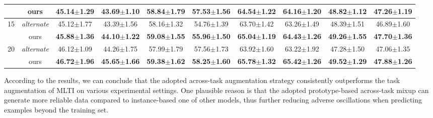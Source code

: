 \begin{table*}[ht]
{\begin{tabular}{@{}c|c|cccccccc@{}}
                      & ours                   & \textbf{45.14$\pm$1.29}          & \textbf{43.69$\pm$1.10}         & \textbf{58.84$\pm$1.79}          & \textbf{57.53$\pm$1.56}         & \textbf{64.54$\pm$1.22}         & \textbf{64.16$\pm$1.20}         & \textbf{48.82$\pm$1.12}         & \textbf{47.26$\pm$1.19}         \\ \midrule
\multirow{2}{*}{15}   & \textit{alternate}                 & 45.12$\pm$1.77                   & 43.39$\pm$1.56                  & 58.16$\pm$1.32                   & 54.76$\pm$1.39                  & 63.70$\pm$1.42                  & 63.26$\pm$1.49                  & 48.39$\pm$1.51                  & 46.89$\pm$1.60                  \\
                      & ours                   & \textbf{45.88$\pm$1.36}          & \textbf{44.10$\pm$1.22}         & \textbf{59.08$\pm$1.55}          & \textbf{55.96$\pm$1.50}         & \textbf{65.04$\pm$1.19}         & \textbf{64.43$\pm$1.26}         & \textbf{49.26$\pm$1.55}         & \textbf{47.70$\pm$1.36}         \\ \midrule
\multirow{2}{*}{20}   & \textit{alternate}                 & 46.12$\pm$1.09                   & 44.26$\pm$1.75                  & 57.99$\pm$1.79                   & 57.56$\pm$1.73                  & 63.92$\pm$1.60                  & 63.22$\pm$1.92                  & 47.28$\pm$1.50                  & 47.06$\pm$1.35                  \\
                      & ours                   & \textbf{46.72$\pm$1.96}          & \textbf{45.65$\pm$1.66}         & \textbf{59.38$\pm$1.62}          & \textbf{58.25$\pm$1.60}         & \textbf{65.78$\pm$1.32}         & \textbf{65.42$\pm$1.26}         & \textbf{49.52$\pm$1.29}         & \textbf{47.88$\pm$1.26}         \\ \bottomrule
\end{tabular}%
}
\end{table*}

According to the results, we can conclude that the adopted across-task augmentation strategy consistently outperforms the task augmentation of MLTI on various experimental settings. One plausible reason is that the adopted prototype-based across-task mixup can generate more reliable data compared to instance-based one of other models, thus further reducing adverse oscillations when predicting examples beyond the training set. %


